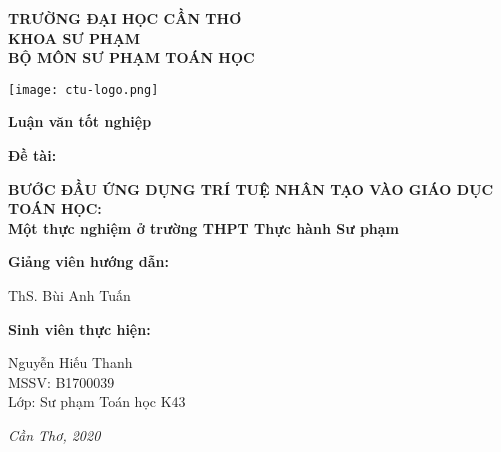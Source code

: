 \thispagestyle{empty}
\begin{center}\large
	\textbf{TRƯỜNG ĐẠI HỌC CẦN THƠ}\\
	\textbf{KHOA SƯ PHẠM}\\
	\textbf{BỘ MÔN SƯ PHẠM TOÁN HỌC}
\end{center}
\vfill
{\centering\texttt{[image: ctu-logo.png]}\par}
\vfill
{\centering\LARGE\textbf{Luận văn tốt nghiệp}\par}
\vfill
\begin{center}\huge
	\textbf{Đề tài:}\par
	\textbf{BƯỚC ĐẦU ỨNG DỤNG TRÍ TUỆ NHÂN TẠO VÀO GIÁO DỤC TOÁN HỌC:}\\
	\textbf{Một thực nghiệm ở trường THPT Thực hành Sư phạm}
\end{center}
\vfill
\begin{adjustwidth}{1cm}{-1cm}
\begin{multicols}{2}\large
	\textbf{Giảng viên hướng dẫn:}\par
	ThS. Bùi Anh Tuấn\par
	\columnbreak
	\textbf{Sinh viên thực hiện:}\par
	Nguyễn Hiếu Thanh\\
	MSSV: B1700039\\
	Lớp: Sư phạm Toán học K43
\end{multicols}
\end{adjustwidth}
\vfill
{\centering\large\textit{Cần Thơ, 2020}\par}
\newpage